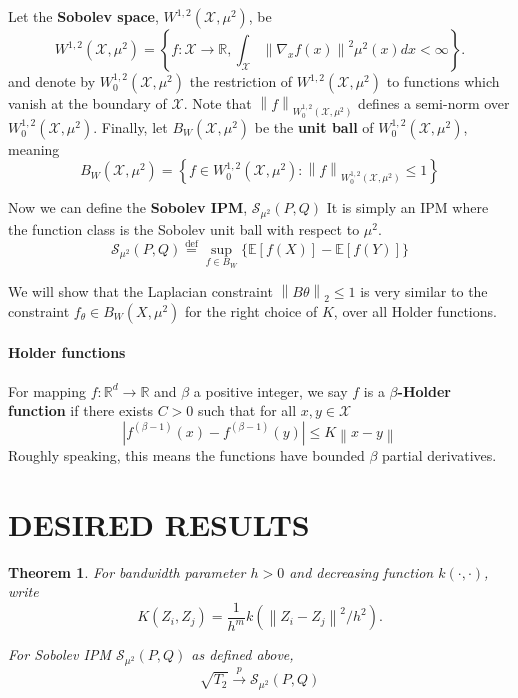 \documentclass{article}
\newcommand{\Reals}{\mathbb{R}}
\newcommand{\convprob}{\overset{p}{\to}}
\newcommand{\Expect}[1]{\mathbb{E}\left[ #1 \right]}
\newcommand{\norm}[1]{\left\lVert#1\right\rVert}
\newcommand{\abs}[1]{\left \lvert #1 \right \rvert}
\newcommand{\set}[1]{\left\{#1\right\}}
\newcommand{\X}{\mathcal{X}}
\newcommand{\Rd}{\Reals^d}
\theoremstyle{alden}
\newtheorem{theorem}{Theorem}
\theoremstyle{definition}
\theoremstyle{remark}
\begin{document}
Let the \textbf{Sobolev space}, $W^{1,2}(\mathcal{X}, \mu^2)$, be 
\begin{equation*}
W^{1,2}(\mathcal{X},\mu^2) = \set{f: \X \to \Reals, \int_{\X} \norm{\nabla_x f(x)}^2 \mu^2(x) dx < \infty}.
\end{equation*}
and denote by $W_0^{1,2}(\mathcal{X}, \mu^2)$ the restriction of $W^{1,2}(\mathcal{X}, \mu^2)$ to functions which vanish at the boundary of $\X$. Note that $\norm{f}_{W_0^{1,2}(\X, \mu^2)}$ defines a semi-norm over $W_0^{1,2}(\X, \mu^2)$. Finally, let $B_W(\X, \mu^2)$ be the \textbf{unit ball} of $W_0^{1,2}(\X, \mu^2)$, meaning
\begin{equation*}
B_W(\X, \mu^2) = \set{f \in W_0^{1,2}(\X, \mu^2): \norm{f}_{W_0^{1,2}(\X, \mu^2)} \leq 1}
\end{equation*}

Now we can define the \textbf{Sobolev IPM}, $\mathcal{S}_{\mu^2}(P,Q)$ It is simply an IPM where the function class is the Sobolev unit ball with respect to $\mu^2$.
\begin{equation*}
\mathcal{S}_{\mu^2}(P,Q) \overset{\mathrm{def}}{=} \sup_{f \in B_W} \biggl\{ \Expect{f(X)} - \Expect{f(Y)}\biggr\}
\end{equation*}

We will show that the Laplacian constraint $\norm{B \theta}_2 \leq 1$ is very similar to the constraint $f_{\theta} \in B_W(X,\mu^2)$ for the right choice of $K$, over all Holder functions. 

\paragraph{Holder functions}
For mapping $f: \Rd \to \Reals$ and $\beta$ a positive integer, we say $f$ is a \textbf{$\beta$-Holder function} if there exists $C > 0$ such that for all $x, y \in \X$
\begin{equation*}
\abs{f^{(\beta - 1)}(x) - f^{(\beta - 1)}(y)} \leq K \norm{x - y}
\end{equation*}
Roughly speaking, this means the functions have bounded $\beta$ partial derivatives.

\section{DESIRED RESULTS}

\begin{theorem}
	\label{thm:convprob_of_T2}
	For bandwidth parameter $h >0$ and decreasing function $k(\cdot,\cdot)$, write
	\begin{equation*}
	K(Z_i,Z_j) = \frac{1}{h^m} k(\norm{Z_i - Z_j}^2 / h^2).
	\end{equation*}
	
	For Sobolev IPM $\mathcal{S}_{\mu^2}(P,Q)$ as defined above,
	\begin{equation*}
	\sqrt{T_2} \convprob \mathcal{S}_{\mu^2}(P,Q)
	\end{equation*}
\end{theorem}
\end{document}
